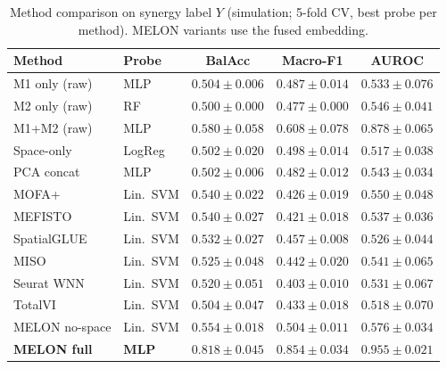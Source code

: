\documentclass{article}
\theoremstyle{plain}
\theoremstyle{definition}
\newcommand{\melon}{MELON}
\begin{document}
\begin{table}[!htbp]
\centering
\caption{Method comparison on synergy label $Y$ (simulation; 5-fold CV, best probe per method). MELON variants use the fused embedding.}
\label{tab:sim-phase2}
\small
\begin{tabular}{llccc}
\toprule
Method & Probe & BalAcc & Macro-F1 & AUROC \\
\midrule
M1 only (raw)             & MLP       & $0.504 \pm 0.006$ & $0.487 \pm 0.014$ & $0.533 \pm 0.076$ \\
M2 only (raw)             & RF        & $0.500 \pm 0.000$ & $0.477 \pm 0.000$ & $0.546 \pm 0.041$ \\
M1+M2 (raw)               & MLP       & $0.580 \pm 0.058$ & $0.608 \pm 0.078$ & $0.878 \pm 0.065$ \\
Space-only                & LogReg    & $0.502 \pm 0.020$ & $0.498 \pm 0.014$ & $0.517 \pm 0.038$ \\
PCA concat                & MLP       & $0.502 \pm 0.006$ & $0.482 \pm 0.012$ & $0.543 \pm 0.034$ \\
\midrule
MOFA+                     & Lin.\ SVM & $0.540 \pm 0.022$ & $0.426 \pm 0.019$ & $0.550 \pm 0.048$ \\
MEFISTO                   & Lin.\ SVM & $0.540 \pm 0.027$ & $0.421 \pm 0.018$ & $0.537 \pm 0.036$ \\
SpatialGLUE               & Lin.\ SVM & $0.532 \pm 0.027$ & $0.457 \pm 0.008$ & $0.526 \pm 0.044$ \\
MISO                      & Lin.\ SVM & $0.525 \pm 0.048$ & $0.442 \pm 0.020$ & $0.541 \pm 0.065$ \\
Seurat WNN                & Lin.\ SVM & $0.520 \pm 0.051$ & $0.403 \pm 0.010$ & $0.531 \pm 0.067$ \\
TotalVI                   & Lin.\ SVM & $0.504 \pm 0.047$ & $0.433 \pm 0.018$ & $0.518 \pm 0.070$ \\
\midrule
\melon{} no-space          & Lin.\ SVM & $0.554 \pm 0.018$ & $0.504 \pm 0.011$ & $0.576 \pm 0.034$ \\
\textbf{\melon{} full}     & \textbf{MLP} & $\mathbf{0.818 \pm 0.045}$ & $\mathbf{0.854 \pm 0.034}$ & $\mathbf{0.955 \pm 0.021}$ \\
\bottomrule
\end{tabular}
\end{table}
\end{document}
